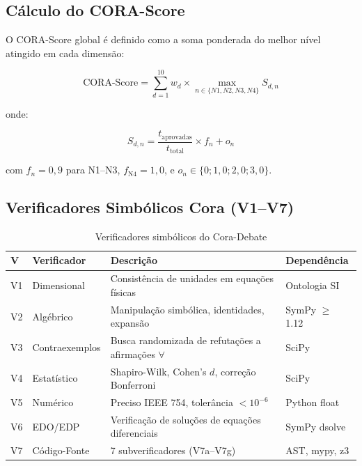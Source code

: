 \documentclass[12pt,a4paper,oneside]{article}
\begin{document}
\subsection{Cálculo do CORA-Score}

O CORA-Score global é definido como a soma ponderada do melhor nível
atingido em cada dimensão:

\begin{equation}\label{eq:corascore}
\text{CORA-Score} = \sum_{d=1}^{10} w_d \times \max_{n \in \{N1,N2,N3,N4\}} S_{d,n}
\end{equation}

onde:

\begin{equation}\label{eq:dimscore}
S_{d,n} = \frac{t_{\text{aprovadas}}}{t_{\text{total}}} \times f_n + o_n
\end{equation}

com $f_n = 0{,}9$ para N1--N3, $f_{\text{N4}} = 1{,}0$, e
$o_n \in \{0; 1{,}0; 2{,}0; 3{,}0\}$.

\subsection{Verificadores Simbólicos Cora (V1--V7)}

\begin{table}[H]
\centering
\caption{Verificadores simbólicos do Cora-Debate}
\label{tab:verificadores}
\begin{tabular}{p{}p{}p{}p{}}
\toprule
\textbf{V} & \textbf{Verificador} & \textbf{Descrição} & \textbf{Dependência} \\
\midrule
V1 & Dimensional & Consistência de unidades em equações físicas & Ontologia SI \\
V2 & Algébrico & Manipulação simbólica, identidades, expansão & SymPy $\geq$ 1.12 \\
V3 & Contraexemplos & Busca randomizada de refutações a afirmações $\forall$ & SciPy \\
V4 & Estatístico & Shapiro-Wilk, Cohen's $d$, correção Bonferroni & SciPy \\
V5 & Numérico & Preciso IEEE 754, tolerância $<10^{-6}$ & Python float \\
V6 & EDO/EDP & Verificação de soluções de equações diferenciais & SymPy dsolve \\
V7 & Código-Fonte & 7 subverificadores (V7a--V7g) & AST, mypy, z3 \\
\bottomrule
\end{tabular}
\end{table}
\end{document}
